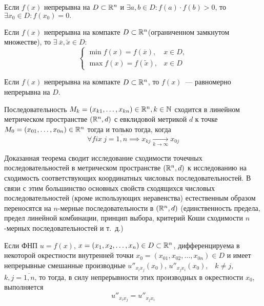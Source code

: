 \documentclass[../main.tex]{subfiles}
\begin{document}
\begin{crl*}
			Если $f(x)$ непрерывна на $D \subset \mathbb{R}^n$ и $\exists a,b \in D: 
			f(a) \cdot f(b) > 0$, то $\exists x_0 \in D : f(x_0) = 0.$
	\end{crl*}
\begin{thm}[Вейерштрасс]
		Если $f(x)$ непрерывна на компакте $D \subset \mathbb{R}^n$(ограниченном 
		замкнутом множестве), то $\exists\ \overline{x}, \widetilde{x} \in D:$
		\[ 
		\begin{cases}
		\min f(x) = f(\overline{x}),& x \in D, \\
		\max f(x) = f(\widetilde{x}),& x \in D
		\end{cases}
		\]
	\end{thm}
\begin{thm}[Кантор]
		Если $f(x)$ непрерывна на компакте $D \subset \mathbb{R}^n$, то $f(x)$~---
		равномерно непрерывна на $D$.
	\end{thm}
\begin{thm}
    Последовательность $M_k = (x_{k1}, \dots, x_{kn}) \in \mathbb{R}^n, k 
    \in \mathbb{N}$ сходится в линейном метрическом пространстве $(\mathbb{R}^n, d)$
    с евклидовой метрикой $d$ к точке $M_0 = (x_{01}, \dots, x_{0n})
    \in \mathbb{R}^n$ тогда и только тогда, когда
    \begin{equation}
    \label{krit-posl}
      \forall fix\ j = \overline{1, n} \implies
      x_{kj}\underset{k\rightarrow\infty}{\longrightarrow} x_{0j}
    \end{equation}
  \end{thm}
\begin{rem}
    Доказанная теорема сводит исследование сходимости точечных 
    последовательностей в метрическом пространстве $(\mathbb{R}^n, d)$ к 
    исследованию на сходимость соответствующих координатных числовых 
    последовательностей.
    В связи с этим большинство основных свойств сходящихся числовых 
    последовательностей (кроме использующих неравенства) естественным
    образом переносятся на $n$-мерные последовательности в $(\mathbb{R}^n, d)$
    (единственность предела, предел линейной комбинации, принцип 
    выбора, критерий Коши сходимости $n$-мерных последовательностей и 
    т.~д.)
  \end{rem}
\begin{thm}
		\label{secdiffeq}
		Если ФНП $u = f(x)$, $x = \left(x_1, x_2, \dots, x_n\right)\in 
		D\subset\mathbb{R}^n$, дифференцируема в некоторой окрестности внутренней 
		точки $x_0 = \left(x_{01}, x_{02}, \dots, x_{0n}\right)\in D$ и имеет 
		непрерывные смешанные производные $u''_{x_ix_j}(x_0)$, 
		$u''_{x_jx_i}(x_0)$,\ \ $k\ne j$,\ \ $k, j = \overline{1, n}$, то тогда, 
		в силу непрерывности этих производных в окрестности $x_0$, выполняется
		\begin{equation}
			u''_{x_ix_j} = u''_{x_jx_i}
			\label{11:diff}
		\end{equation}
	\end{thm}
\end{document}
